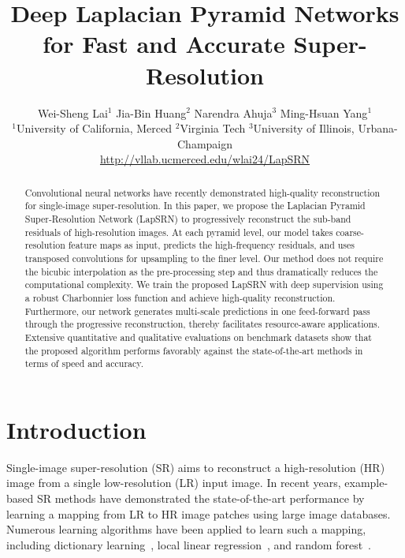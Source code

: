 \documentclass[10pt,twocolumn,letterpaper]{article}
\begin{document}
	\title{Deep Laplacian Pyramid Networks for Fast and Accurate Super-Resolution}
	
	\author{
		Wei-Sheng Lai$^{1}$ 
		\hspace{25pt} 
		Jia-Bin Huang$^{2}$ 
		\hspace{25pt} 
		Narendra Ahuja$^{3}$
		\hspace{25pt} 
		Ming-Hsuan Yang$^{1}$
		\\
		$^1$University of California, Merced
		\hspace{20pt} 
		$^2$Virginia Tech
		\hspace{20pt} 
		$^3$University of Illinois, Urbana-Champaign \\
		{\small
			\url{http://vllab.ucmerced.edu/wlai24/LapSRN}
		}
	}
	\maketitle
	\begin{abstract}
		Convolutional neural networks have recently demonstrated high-quality reconstruction for single-image super-resolution.
		In this paper, we propose the Laplacian Pyramid Super-Resolution Network (LapSRN) to progressively reconstruct the sub-band residuals of high-resolution images.
		At each pyramid level, our model takes coarse-resolution feature maps as input, predicts the high-frequency residuals, and uses transposed convolutions for upsampling to the finer level.
		Our method does not require the bicubic interpolation as the pre-processing step and thus dramatically reduces the computational complexity.
		We train the proposed LapSRN with deep supervision using a robust Charbonnier loss function and achieve high-quality reconstruction.
		Furthermore, our network generates multi-scale predictions in one feed-forward pass through the progressive reconstruction, thereby facilitates resource-aware applications.
		Extensive quantitative and qualitative evaluations on benchmark datasets show that the proposed algorithm performs favorably against the state-of-the-art methods in terms of speed and accuracy.
	\end{abstract}
	
	
	\section{Introduction}
	Single-image super-resolution (SR) aims to reconstruct a high-resolution (HR) image from a single low-resolution (LR) input image.
	In recent years, example-based SR methods have demonstrated the state-of-the-art performance by learning a mapping from LR to HR image patches using large image databases.
	Numerous learning algorithms have been applied to learn such a mapping, 
	including dictionary learning~\cite{Yang-CVPR-2008,Yang-TIP-2010}, local linear regression~\cite{A+,Yang-ICCV-2013}, and random forest~\cite{RFL}.
	
\end{document}
